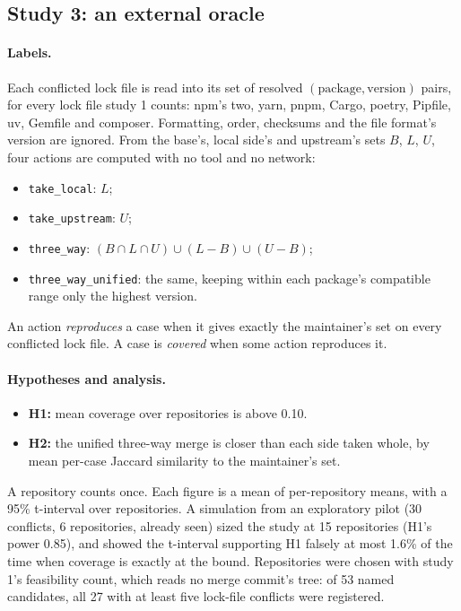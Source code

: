 \documentclass[11pt]{article}
\newcommand{\code}[1]{\texttt{#1}}
\begin{document}
\subsection{Study 3: an external oracle}

\paragraph{Labels.}
Each conflicted lock file is read into its set of resolved $(\text{package}, \text{version})$
pairs, for every lock file study 1 counts: npm's two, yarn, pnpm, Cargo, poetry, Pipfile, uv,
Gemfile and composer. Formatting, order, checksums and the file format's version are ignored.
From the base's, local side's and upstream's sets $B$, $L$, $U$, four actions are computed with
no tool and no network:
\begin{itemize}
  \item \code{take\_local}: $L$;
  \item \code{take\_upstream}: $U$;
  \item \code{three\_way}: $(B\cap L\cap U)\cup(L-B)\cup(U-B)$;
  \item \code{three\_way\_unified}: the same, keeping within each package's compatible range only
  the highest version.
\end{itemize}
An action \emph{reproduces} a case when it gives exactly the maintainer's set on every conflicted
lock file. A case is \emph{covered} when some action reproduces it.

\paragraph{Hypotheses and analysis.}
\begin{itemize}
  \item \textbf{H1:} mean coverage over repositories is above 0.10.
  \item \textbf{H2:} the unified three-way merge is closer than each side taken whole, by mean
  per-case Jaccard similarity to the maintainer's set.
\end{itemize}
A repository counts once. Each figure is a mean of per-repository means, with a 95\% t-interval
over repositories. A simulation from an exploratory pilot (30 conflicts, 6 repositories, already
seen) sized the study at 15 repositories (H1's power 0.85), and showed the t-interval
supporting H1 falsely at most 1.6\% of the time when coverage is exactly at the bound.
Repositories were chosen with study 1's feasibility count, which reads no merge commit's tree:
of 53 named candidates, all 27 with at least five lock-file conflicts were registered.
\end{document}
